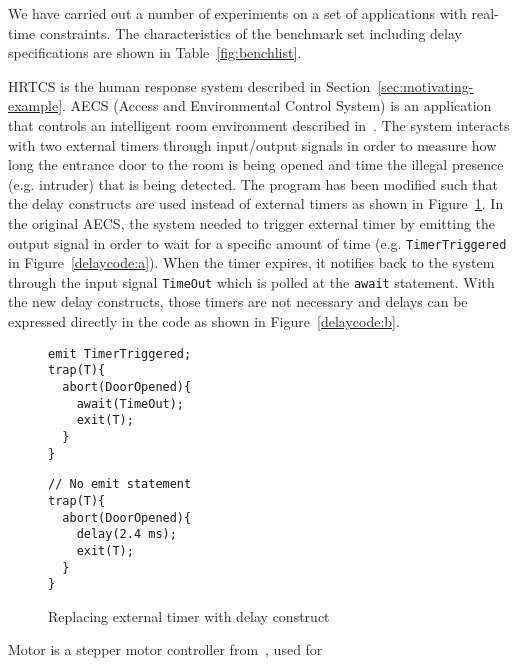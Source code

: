 We have carried out a number of experiments on a set of applications
with real-time constraints. The characteristics of the benchmark set
including delay specifications are shown in Table~\ref{fig:benchlist}. 

HRTCS is the human response system described in
Section~\ref{sec:motivating-example}. AECS (Access and Environmental
Control System) is an application that controls an intelligent room
environment described in~\cite{aecs_ispa}.  The system interacts with
two external timers through input/output signals in order to measure how
long the entrance door to the room is being opened and time the illegal
presence (e.g. intruder) that is being detected. The program has been
modified such that the delay constructs are used instead of external
timers as shown in Figure~\ref{delaycode}. In the original AECS, the
system needed to trigger external timer by emitting the output signal in
order to wait for a specific amount of time (e.g.
\texttt{TimerTriggered} in Figure~\ref{delaycode:a}). When the timer
expires, it notifies back to the system through the input signal
\texttt{TimeOut} which is polled at the \texttt{await} statement. With
the new delay constructs, those timers are not necessary and delays can
be expressed directly in the code as shown in Figure~\ref{delaycode:b}.
\begin{figure}[h!]
	\begin{SubFloat}{\label{delaycode:a}}
		\centering
		\begin{minipage}[b]{0.3\linewidth}
			\scriptsize
\begin{verbatim}
emit TimerTriggered;
trap(T){
  abort(DoorOpened){
    await(TimeOut);
    exit(T); 
  }
}
\end{verbatim}
		\end{minipage}
	\end{SubFloat}
\hspace{1cm}%
	\begin{SubFloat}{\label{delaycode:b}}
		\centering
		\begin{minipage}[b]{0.5\linewidth}
			\scriptsize
\begin{verbatim}
// No emit statement
trap(T){
  abort(DoorOpened){
    delay(2.4 ms);
    exit(T);  
  }
}
\end{verbatim}
		\end{minipage}
	\end{SubFloat}
\caption{Replacing external timer with delay construct}
\label{delaycode}
\end{figure}
Motor is a stepper motor controller from~\cite{Bourke2009a}, used for
